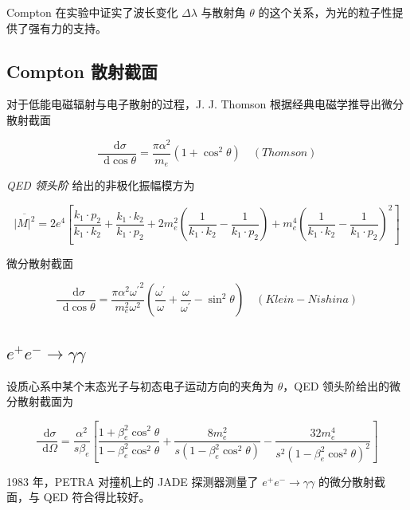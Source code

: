 \documentclass[oneside,a4paper,openany,11pt]{ctexbook}
\newcommand*{\dif}{\mathop{}\!\mathrm{d}} %
\begin{document}
Compton 在实验中证实了波长变化 $\Delta\lambda$ 与散射角 $\theta$ 的这个关系，为光的粒子性提供了强有力的支持。

\subsection{Compton 散射截面}

对于低能电磁辐射与电子散射的过程，J. J. Thomson 根据经典电磁学推导出微分散射截面

\begin{equation}
    \frac{\dif\sigma}{\dif\cos\theta} = \frac{\pi \alpha^2}{m_e} (1+\cos^2 \theta) \quad (Thomson)
\end{equation}

\emph{QED 领头阶} 给出的非极化振幅模方为

\begin{equation}
    \overline{|M|^2} = 2 e^4 \left[\frac{k_1 \cdot p_2}{k_1 \cdot k_2} + \frac{k_1 \cdot k_2}{k_1 \cdot p_2} + 2 m_e^2 \left(\frac{1}{k_1 \cdot k_2} - \frac{1}{k_1 \cdot p_2}\right) + m_e^4 \left(\frac{1}{k_1 \cdot k_2} - \frac{1}{k_1 \cdot p_2}\right)^2\right]
\end{equation}

微分散射截面

\begin{equation}
    \frac{\dif\sigma}{\dif\cos\theta} = \frac{\pi \alpha^2 {\omega^\prime}^2}{m_e^2 \omega^2} \left(\frac{\omega^\prime}{\omega} + \frac{\omega}{\omega^\prime} - \sin^2 \theta\right) \quad (Klein-Nishina)
\end{equation}

\subsection{\texorpdfstring{$e^+ e^- \to \gamma\gamma$}{e+e- -> gamma gamma}}

设质心系中某个末态光子与初态电子运动方向的夹角为 $\theta$，QED 领头阶给出的微分散射截面为

\begin{equation}
    \frac{\dif\sigma}{\dif\Omega} = \frac{\alpha^2}{s \beta_e} \left[\frac{1 + \beta_e^2 \cos^2 \theta}{1 - \beta_e^2 \cos^2 \theta} + \frac{8 m_e^2}{s(1 - \beta_e^2 \cos^2 \theta)} - \frac{32 m_e^4}{s^2(1 - \beta_e^2 \cos^2 \theta)^2}\right]
\end{equation}

1983 年，PETRA 对撞机上的 JADE 探测器测量了 $e^+ e^- \to \gamma\gamma$ 的微分散射截面，与 QED 符合得比较好。
\end{document}
